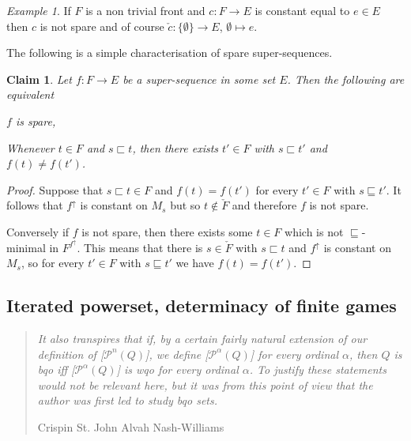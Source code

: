 \documentclass{article}%
\theoremstyle{plain}
\newtheorem{lemma}[theorem]{Properties}
\newtheorem{lemma}[theorem]{Lemma}
\newtheorem{lemma}[theorem]{Fact}
\newtheorem{lemma}[theorem]{Facts}
\newtheorem{lemma}{Claim}
\theoremstyle{definition}
\theoremstyle{remark}
\newtheorem{example}[theorem]{Example}
\DeclareMathOperator{\upcl}{\uparrow}
\newcommand{\segm} {\sqsubseteq}
\newcommand{\segs} {\sqsubset}
\begin{document}
\begin{example}
If $F$ is a non trivial front and $c:F\to E$ is constant equal to $e\in E$ then $c$ is not spare and of course $\check{c}:\{\emptyset\}\to E$, $\emptyset\mapsto e$.
\end{example}

The following is a simple characterisation of spare super-sequences.

\begin{lemma} \label{lem Spare}
Let $f:F\to E$ be a super-sequence in some set $E$. Then the following are equivalent
\begin{enumThm}
\item $f$ is spare,
\item Whenever $t\in F$ and $s\segs t$, then there exists $t'\in F$ with $s\segs t'$ and $f(t)\neq f(t')$.
\end{enumThm} 
\end{lemma}
\begin{proof}
Suppose that $s\segs t \in F$ and $f(t)=f(t')$ for every $t'\in F$ with $s\segm t'$. It follows that $f^{\upcl}$ is constant on $M_{s}$ but so $t\notin \check{F}$ and therefore $f$ is not spare.

Conversely if $f$ is not spare, then there exists some $t\in F$ which is not $\segm$-minimal in $F^{f^{\upcl}}$. This means that there is $s\in \check{F}$ with $s\segs t$ and $f^{\upcl}$ is constant on $M_{s}$, so for every $t'\in F$ with $s\segm t'$ we have $f(t)=f(t')$.
\end{proof}

 
 

\subsection{Iterated powerset, determinacy of finite games}\label{sec bqoPower}
 
  \begin{quote}
{\itshape It also transpires that if, by a certain fairly natural extension of our definition of \textnormal{[$\mathcal{P}^{n}(Q)$]}, we define \textnormal{[$\mathcal{P}^{\alpha}(Q)$]} for every ordinal $\alpha$, then $Q$ is bqo iff \textnormal{[$\mathcal{P}^{\alpha}(Q)$]} is wqo for every ordinal $\alpha$. To justify these statements would not be relevant here, but it was from this point of view that the author was first led to study bqo sets.}
 
 \flushright Crispin St. John Alvah Nash-Williams \cite[p. 700]{nash1965welltrees}
 \end{quote}
\end{document}
